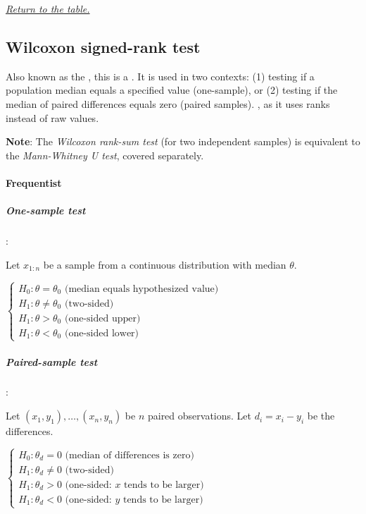 \textit{\hyperref[statistical_method_table]{Return to the table.}}


\subsection{Wilcoxon signed-rank test}

Also known as the , this
is a . It is used in
two contexts: (1) testing if a population median equals a specified value (one-sample), or
(2) testing if the median of paired differences equals zero (paired samples). , as it uses
ranks instead of raw values.

\textbf{Note}: The \emph{Wilcoxon rank-sum test} (for two independent samples) is equivalent
to the \emph{Mann-Whitney U test}, covered separately.

\paragraph{Frequentist}

\subparagraph{One-sample test}:

Let $x_{1:n}$ be a sample from a continuous distribution with median $\theta$.

$\begin{cases}
    H_{0}: \theta = \theta_0 \text{ (median equals hypothesized value)} \\
    H_{1}: \theta \neq \theta_0 \text{ (two-sided)} \\
    H_{1}: \theta > \theta_0 \text{ (one-sided upper)} \\
    H_{1}: \theta < \theta_0 \text{ (one-sided lower)}
\end{cases}$

\subparagraph{Paired-sample test}:

Let $(x_1, y_1), \ldots, (x_n, y_n)$ be $n$ paired observations. Let $d_i = x_i - y_i$
be the differences.

$\begin{cases}
    H_{0}: \theta_d = 0 \text{ (median of differences is zero)} \\
    H_{1}: \theta_d \neq 0 \text{ (two-sided)} \\
    H_{1}: \theta_d > 0 \text{ (one-sided: } x \text{ tends to be larger)} \\
    H_{1}: \theta_d < 0 \text{ (one-sided: } y \text{ tends to be larger)}
\end{cases}$

